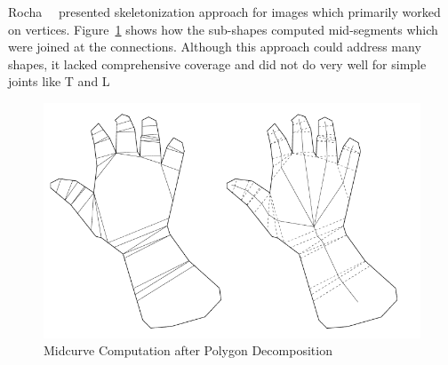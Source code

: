
Rocha~\cite{Rocha98}~\cite{Rocha99} presented skeletonization approach for images which primarily worked on vertices. Figure~\ref{fig_rocha} shows how the sub-shapes computed mid-segments which were joined at the connections. Although this approach could address many shapes, it lacked comprehensive coverage and did not do very well for simple joints like T and L


\begin{figure}[h]
\centering \includegraphics[width=0.5\linewidth]{../Common/images/rocha} 
\caption{Midcurve Computation after Polygon Decomposition}
\label{fig_rocha}
\end{figure}

